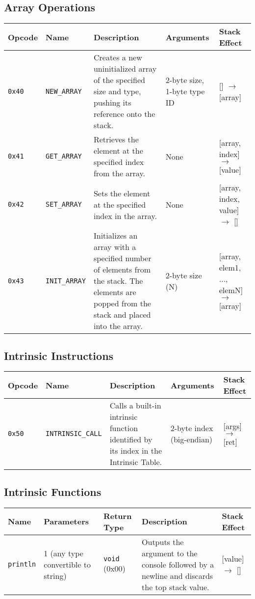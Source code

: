 \documentclass[a4paper,12pt]{article}
\begin{document}
    \subsection{Array Operations}
    \begin{tabular}{|l|l|p{4cm}|p{4cm}|p{4cm}|}
        \hline
        \textbf{Opcode} & \textbf{Name} & \textbf{Description} & \textbf{Arguments} & \textbf{Stack Effect} \\ \hline
        \texttt{0x40} & \texttt{NEW\_ARRAY} & Creates a new uninitialized array of the specified size and type, pushing its reference onto the stack. & 2-byte size, 1-byte type ID & [] $\rightarrow$ [array] \\ \hline
        \texttt{0x41} & \texttt{GET\_ARRAY} & Retrieves the element at the specified index from the array. & None & [array, index] $\rightarrow$ [value] \\ \hline
        \texttt{0x42} & \texttt{SET\_ARRAY} & Sets the element at the specified index in the array. & None & [array, index, value] $\rightarrow$ [] \\ \hline
        \texttt{0x43} & \texttt{INIT\_ARRAY} & Initializes an array with a specified number of elements from the stack. The elements are popped from the stack and placed into the array. & 2-byte size (N) & [array, elem1, ..., elemN] $\rightarrow$ [array] \\ \hline
    \end{tabular}
    \label{tab:array_operations}

    \subsection{Intrinsic Instructions}
    \begin{tabular}{|l|l|p{4cm}|l|l|}
        \hline
        \textbf{Opcode} & \textbf{Name} & \textbf{Description} & \textbf{Arguments} & \textbf{Stack Effect} \\ \hline
        \texttt{0x50} & \texttt{INTRINSIC\_CALL} & Calls a built-in intrinsic function identified by its index in the Intrinsic Table. & 2-byte index (big-endian) & [args] $\rightarrow$ [ret] \\ \hline
    \end{tabular}
    \label{tab:intrinsic_instructions}

    \subsection{Intrinsic Functions}
    \begin{tabular}{|l|l|l|p{4cm}|l|}
        \hline
        \textbf{Name} & \textbf{Parameters} & \textbf{Return Type} & \textbf{Description} & \textbf{Stack Effect} \\ \hline
        \texttt{println} & 1 (any type convertible to string) & \texttt{void} (0x00) & Outputs the argument to the console followed by a newline and discards the top stack value. & [value] $\rightarrow$ [] \\ \hline
    \end{tabular}
    \label{tab:intrinsic_functions}
\end{document}
